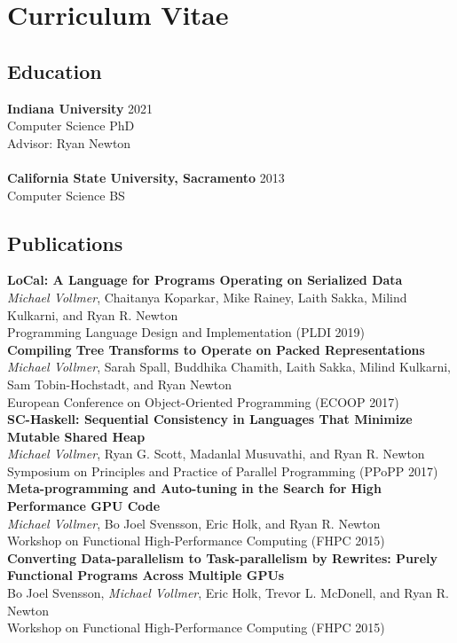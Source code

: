\chapter*{Curriculum Vitae}
\setlength{\parindent}{0pt}

\section*{Education}
\textbf{Indiana University} \hfill 2021 \\
Computer Science PhD  \\
Advisor: Ryan Newton \\ \\
\textbf{California State University, Sacramento} \hfill 2013 \\
Computer Science BS  \\

\section*{Publications}

{\bf LoCal: A Language for Programs Operating on Serialized Data} \\
\emph{Michael Vollmer}, Chaitanya Koparkar, Mike Rainey, Laith Sakka, Milind Kulkarni, and Ryan R. Newton \\
Programming Language Design and Implementation (PLDI 2019) \\
 {\bf Compiling Tree Transforms to Operate on Packed Representations}\\
\emph{Michael Vollmer}, Sarah Spall, Buddhika Chamith, Laith Sakka, Milind Kulkarni, Sam Tobin-Hochstadt, and Ryan Newton \\
European Conference on Object-Oriented Programming (ECOOP 2017) \\
{\bf SC-Haskell: Sequential Consistency in Languages That Minimize Mutable Shared Heap}  \\
\emph{Michael Vollmer}, Ryan G. Scott, Madanlal Musuvathi, and Ryan R. Newton \\
Symposium on Principles and Practice of Parallel Programming (PPoPP 2017) \\
{\bf Meta-programming and Auto-tuning in the Search for High Performance GPU Code}  \\
\emph{Michael Vollmer}, Bo Joel Svensson, Eric Holk, and Ryan R. Newton \\
Workshop on Functional High-Performance Computing (FHPC 2015) \\
{\bf Converting Data-parallelism to Task-parallelism by Rewrites: Purely Functional Programs Across Multiple GPUs} \\
Bo Joel Svensson, \emph{Michael Vollmer}, Eric Holk, Trevor L. McDonell, and Ryan R. Newton \\
Workshop on Functional High-Performance Computing (FHPC 2015) \\
